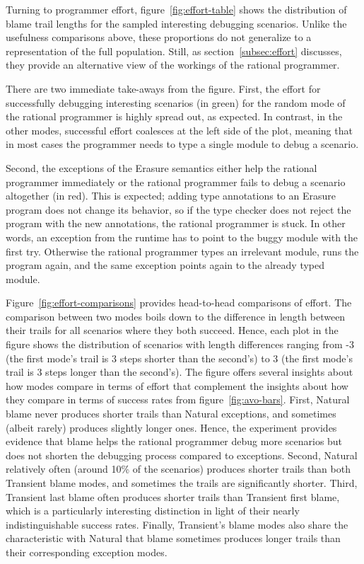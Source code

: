 Turning to programmer effort, figure~\ref{fig:effort-table} shows the
distribution of blame trail lengths for the sampled interesting debugging
scenarios. Unlike the usefulness comparisons above, these proportions do
not generalize to a representation of the full population.  Still, as
section~\ref{subsec:effort} discusses, they provide an alternative view of
the workings of the rational programmer. 

There are two immediate take-aways from the figure. First, the effort for
successfully debugging interesting scenarios (in green) for the random
mode of the rational programmer is highly spread out, as
expected. In contrast, in the other modes, successful effort coalesces at
the left side of the plot, meaning that in most cases the programmer needs
to type a single module to debug a scenario. 

Second, the exceptions of the Erasure semantics either help the rational
programmer immediately or the rational programmer fails to debug a scenario
altogether (in red).  This is expected; adding type annotations to an Erasure
program does not change its behavior, so if the type checker does not reject the
program with the new annotations, the rational programmer is stuck.  In other
words, an exception from the runtime has to point to the buggy module with the
first try. Otherwise the rational programmer types an irrelevant module, runs
the program again, and the same exception points again to the already typed
module.

Figure~\ref{fig:effort-comparisons} provides head-to-head comparisons of
effort.  The comparison between two modes boils down to the difference in
length between their trails for all scenarios where they both succeed.
Hence, each plot in the figure shows the distribution of scenarios with
length differences ranging from -3 (the first mode's trail is 3 steps
shorter than the second's) to 3 (the first mode's trail is 3 steps longer
than the second's).  The figure offers several insights about how  modes
compare in terms of effort that complement the insights about how they
compare in terms of success rates from figure~\ref{fig:avo-bars}.  First,
Natural blame never produces shorter trails than Natural exceptions, and
sometimes (albeit rarely) produces slightly longer ones.  Hence, the
experiment provides evidence that blame helps the rational programmer
debug more scenarios but does not shorten the debugging process compared
to exceptions. Second, Natural relatively often (around 10\% of the
scenarios) produces shorter trails than both Transient blame modes, and
sometimes the trails are significantly shorter.  Third, Transient last
blame often produces shorter trails than Transient first blame, which is a
particularly interesting distinction in light of their nearly
indistinguishable success rates.  Finally, Transient's blame modes also
share the characteristic with Natural that blame sometimes produces longer
trails than their corresponding exception modes.

